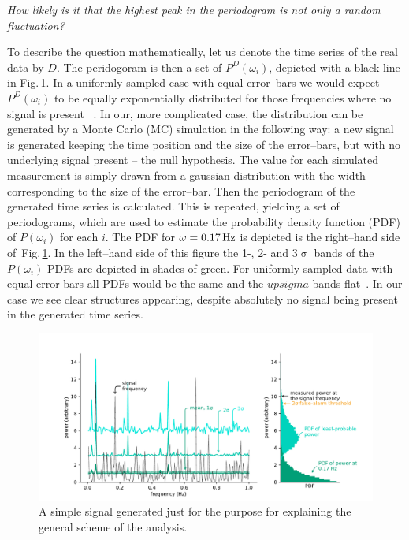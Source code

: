 \begin{center}
  \emph{How likely is it that the highest peak in the periodogram is not only a random fluctuation?}
\end{center}


To describe the question mathematically, let us denote the time series of the real data by $D$. The peridogoram is then a set of $P^D(\omega_i)$, depicted with a black line in Fig.\,\ref{fig:basic_detection}. In a uniformly sampled case with equal error--bars we would expect $P^D(\omega_i)$ to be equally exponentially distributed for those frequencies where no signal is present ~\cite{Scargle1982}. In our, more complicated case, the distribution can be generated by a Monte Carlo (MC) simulation in the following way: a new signal is generated keeping the time position and the size of the error--bars, but with no underlying signal present -- the null hypothesis. The value for each simulated measurement is simply drawn from a gaussian distribution with the width corresponding to the size of the error--bar. Then the periodogram of the generated time series is calculated. This is repeated, yielding a set of periodograms, which are used to estimate the probability density function (PDF) of $P(\omega_i)$ for each $i$. The PDF for $\omega = \unit[0.17]{Hz}$ is depicted is the right--hand side of~Fig.\,\ref{fig:basic_detection}. In the left--hand side of this figure the 1-, 2- and $3\upsigma$ bands of the $P(\omega_i)$ PDFs are depicted in shades of green. For uniformly sampled data with equal error bars all PDFs would be the same and the $upsigma$ bands flat~\cite{Scargle1982}. In our case we see clear structures appearing, despite absolutely no signal being present in the generated time series.

\begin{figure}
  \centering \includegraphics[width=\linewidth]{gfx/axions/basic_detection.pdf}
  \caption{A simple signal generated just for the purpose for explaining the general scheme of the analysis.}
  \label{fig:basic_detection}
\end{figure}

